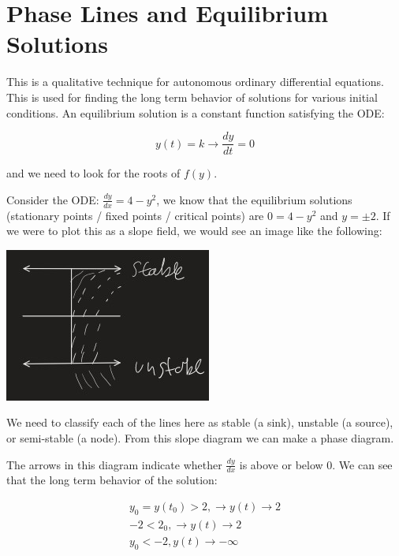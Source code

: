 \section{}
\section{Phase Lines and Equilibrium Solutions}

  This is a qualitative technique for autonomous ordinary differential equations. This is used for finding the long term behavior of solutions for various initial conditions. An equilibrium solution is a constant function satisfying the ODE:

  \[
    y(t)=k\to\frac{dy}{dt}=0
  \]

  and we need to look for the roots of $f(y)$.

  \begin{problem}
    Consider the ODE: $\frac{dy}{dx}=4-y^2$, we know that the equilibrium solutions (stationary points / fixed points / critical points) are $0=4-y^2$ and $y=\pm2$.  If we were to plot this as a slope field, we would see an image like the following:
  
    \begin{center}
      \includegraphics{resource/images/2.7 Example 1.jpg}
    \end{center}

    We need to classify each of the lines here as stable (a sink), unstable (a source), or semi-stable (a node). From this slope diagram we can make a phase diagram.

      

    The arrows in this diagram indicate whether $\frac{dy}{dx}$ is above or below $0$. We can see that the long term behavior of the solution:

    \[
      \begin{aligned}
        y_0 = y(t_0) > 2,\to y(t)\to 2\\
        - 2 < 2_0,\to y(t)\to 2\\
        y_0 <- 2, y(t)\to -\infty\\
      \end{aligned}
    \]
  \end{problem}

